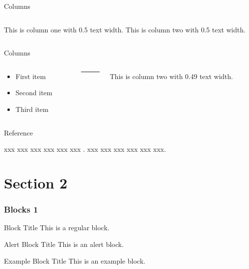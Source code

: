 \documentclass[compress,aspectratio=43]{beamer}
\begin{document}
\begin{frame}{Columns}
    \begin{columns}
        This is column one with 0.5 text width.
        This is column two with 0.5 text width.
    \end{columns}
\end{frame}


\begin{frame}{Columns}

    \begin{columns}
        \begin{column}{0.49\textwidth}
            \begin{itemize}
                \item First item
                \item Second item
                \item Third item
            \end{itemize}
        \end{column}
        \begin{column}{.02\textwidth}
            \rule{.1mm}{0.7\textheight}
        \end{column}
        \begin{column}{0.49\textwidth}
            This is column two with 0.49 text width.
        \end{column}

    \end{columns}

\end{frame}

\begin{frame}{Reference}

    xxx xxx xxx xxx xxx xxx .
    xxx xxx xxx xxx xxx xxx.

\end{frame}

\section{Section 2}

\begin{frame}
    \frametitle{Blocks 1}
    \begin{block}{Block Title}
        This is a regular block.
    \end{block}

    \begin{alertblock}{Alert Block Title}
        This is an alert block.
    \end{alertblock}

    \begin{exampleblock}{Example Block Title}
        This is an example block.
    \end{exampleblock}
\end{frame}
\end{document}
